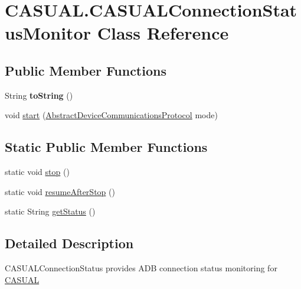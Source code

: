 \hypertarget{class_c_a_s_u_a_l_1_1_c_a_s_u_a_l_connection_status_monitor}{\section{C\-A\-S\-U\-A\-L.\-C\-A\-S\-U\-A\-L\-Connection\-Status\-Monitor Class Reference}
\label{class_c_a_s_u_a_l_1_1_c_a_s_u_a_l_connection_status_monitor}
}
\subsection*{Public Member Functions}
\begin{DoxyCompactItemize}
\item 
\hypertarget{class_c_a_s_u_a_l_1_1_c_a_s_u_a_l_connection_status_monitor_a98485536061598b4908303d8a5ccbd73}{String {\bfseries to\-String} ()}\label{class_c_a_s_u_a_l_1_1_c_a_s_u_a_l_connection_status_monitor_a98485536061598b4908303d8a5ccbd73}

\item 
void \hyperlink{class_c_a_s_u_a_l_1_1_c_a_s_u_a_l_connection_status_monitor_a7310a2a09b13e9724443351c4f806197}{start} (\hyperlink{class_c_a_s_u_a_l_1_1communicationstools_1_1_abstract_device_communications_protocol}{Abstract\-Device\-Communications\-Protocol} mode)
\end{DoxyCompactItemize}
\subsection*{Static Public Member Functions}
\begin{DoxyCompactItemize}
\item 
static void \hyperlink{class_c_a_s_u_a_l_1_1_c_a_s_u_a_l_connection_status_monitor_a9332d058dbb918df26e3c9a1058182b8}{stop} ()
\item 
static void \hyperlink{class_c_a_s_u_a_l_1_1_c_a_s_u_a_l_connection_status_monitor_a3ce78c3aeb51f5f966324f4808f86778}{resume\-After\-Stop} ()
\item 
static String \hyperlink{class_c_a_s_u_a_l_1_1_c_a_s_u_a_l_connection_status_monitor_ab81023fae8ccfd193ebd0c926df29af4}{get\-Status} ()
\end{DoxyCompactItemize}


\subsection{Detailed Description}
C\-A\-S\-U\-A\-L\-Connection\-Status provides A\-D\-B connection status monitoring for \hyperlink{namespace_c_a_s_u_a_l}{C\-A\-S\-U\-A\-L}

